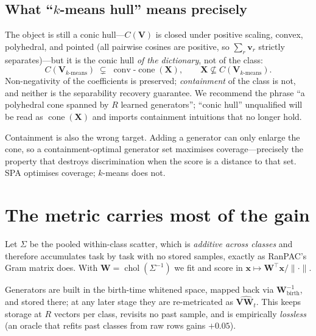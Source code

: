 \documentclass[10pt,twocolumn]{article}
\newcommand{\cone}{\operatorname{cone}}
\newcommand{\conv}{\operatorname{conv}}
\newcommand{\bx}{\mathbf{x}}
\newcommand{\bv}{\mathbf{v}}
\newcommand{\bV}{\mathbf{V}}
\newcommand{\bW}{\mathbf{W}}
\newcommand{\bX}{\mathbf{X}}
\begin{document}
\subsection{What ``$k$-means hull'' means precisely}
\label{sec:naming}
The object is still a conic hull---$C(\bV)$ is closed under positive scaling,
convex, polyhedral, and pointed (all pairwise cosines are positive, so
$\sum_r\bv_r$ strictly separates)---but it is the conic hull \emph{of the
dictionary}, not of the class:
\begin{equation}
C(\bV_{k\text{-means}}) \;\subsetneq\; \conv\text{-}\cone(\bX), \qquad
\bX \not\subseteq C(\bV_{k\text{-means}}).
\end{equation}
Non-negativity of the coefficients is preserved; \emph{containment} of the class
is not, and neither is the separability recovery guarantee. We recommend the
phrase ``a polyhedral cone spanned by $R$ learned generators''; ``conic hull''
unqualified will be read as $\cone(\bX)$ and imports containment intuitions that
no longer hold.

Containment is also the wrong target. Adding a generator can only enlarge the
cone, so a containment-optimal generator set maximises coverage---precisely the
property that destroys discrimination when the score is a distance to that set.
SPA optimises coverage; $k$-means does not.

\section{The metric carries most of the gain}

Let $\Sigma$ be the pooled within-class scatter, which is \emph{additive across
classes} and therefore accumulates task by task with no stored samples, exactly
as RanPAC's Gram matrix does. With $\bW = \operatorname{chol}(\Sigma^{-1})$ we
fit and score in $\bx \mapsto \bW^{\!\top}\bx/\lVert\cdot\rVert$.

Generators are built in the birth-time whitened space, mapped back via
$\bW_{\text{birth}}^{-1}$, and stored there; at any later stage they are
re-metricated as $\widehat{\bV\bW_t}$. This keeps storage at $R$ vectors per class,
revisits no past sample, and is empirically \emph{lossless} (an oracle that
refits past classes from raw rows gains $+0.05$).
\end{document}
